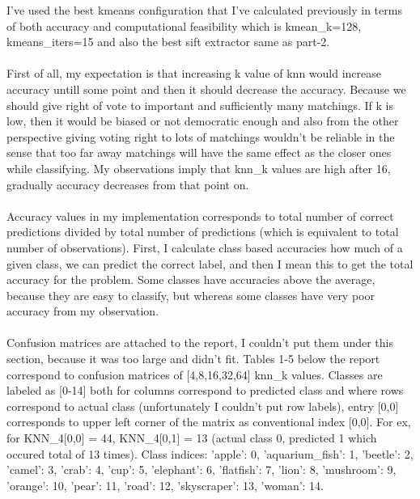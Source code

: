 \documentclass[12pt]{article}
\begin{document}
        \begin{center}
            \raggedright
            I've used the best kmeans configuration that I've calculated previously in terms of both accuracy and computational feasibility which
            is kmean\_k=128, kmeans\_iters=15 and also the best sift extractor same as part-2.
            \\~\\
            First of all, my expectation is that increasing k value of knn would increase accuracy untill some point and then it should decrease the accuracy.
            Because we should give right of vote to important and sufficiently many matchings.
            If k is low, then it would be biased or not democratic enough and also from the other perspective giving voting right to lots of matchings wouldn't be reliable in the sense that
            too far away matchings will have the same effect as the closer ones while classifying.
            My observations imply that knn\_k values are high after 16, gradually accuracy decreases from that point on.
            \\~\\
            Accuracy values in my implementation corresponds to total number of correct predictions divided by total number of predictions (which is equivalent to total number of observations).
            First, I calculate class based accuracies how much of a given class, we can predict the correct label, and then
            I mean this to get the total accuracy for the problem. Some classes have accuracies above the average, because they are easy to classify, but
            whereas some classes have very poor accuracy from my observation.
            \\~\\
            Confusion matrices are attached to the report, I couldn't put them under this section, because it was too large and didn't fit.
            Tables 1-5 below the report correspond to confusion matrices of [4,8,16,32,64] knn\_k values.
            Classes are labeled as [0-14] both for columns correspond to predicted class and where rows correspond to actual class (unfortunately I couldn't put row labels), entry [0,0] corresponds to upper left corner of the matrix as conventional index [0,0]. 
            For ex, for KNN\_4[0,0] = 44, KNN\_4[0,1] = 13 (actual class 0, predicted 1 which occured total of 13 times). Class indices: {'apple': 0, 'aquarium\_fish': 1, 'beetle': 2, 'camel': 3, 'crab': 4, 'cup': 5, 'elephant': 6, 'flatfish': 7, 'lion': 8, 'mushroom': 9, 'orange': 10, 'pear': 11, 'road': 12, 'skyscraper': 13, 'woman': 14}.


        \end{center}
\end{document}
